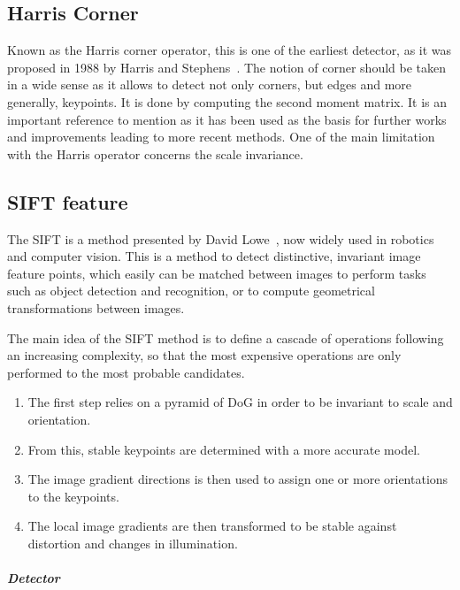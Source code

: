 \subsection{Harris Corner}

Known as the Harris corner operator, this is one of the earliest detector, as it was proposed in 1988 by Harris and Stephens~\cite{Harris88alvey}. The  notion of corner should be taken in a wide sense as it allows to detect not only corners, but edges and more generally, keypoints. It is done by computing the second moment matrix. It is an important reference to mention as it has been used as the basis for further works and improvements leading to more recent methods. One of the main limitation with the Harris operator concerns the scale invariance.

\subsection{SIFT feature}

The \gls{SIFT} is a method presented by David Lowe~\cite{lowe_2004_sift}, now widely used in robotics and computer vision.
This is a method to detect distinctive, invariant image feature points, which easily can be matched between images to perform tasks such as object detection and recognition, or to compute geometrical transformations between images.

The main idea of the \gls{SIFT} method is to define a cascade of operations following an increasing complexity, so that the most expensive operations are only performed to the most probable candidates.
\begin{enumerate}
\item The first step relies on a pyramid of \gls{DoG} in order to be invariant to scale and orientation.
\item From this, stable keypoints are determined with a more accurate model.
\item The image gradient directions is then used to assign one or more orientations to the keypoints.
\item The local image gradients are then transformed to be stable against distortion and changes in illumination.
\end{enumerate}

\clearpage
\paragraph{\emph{Detector}}

